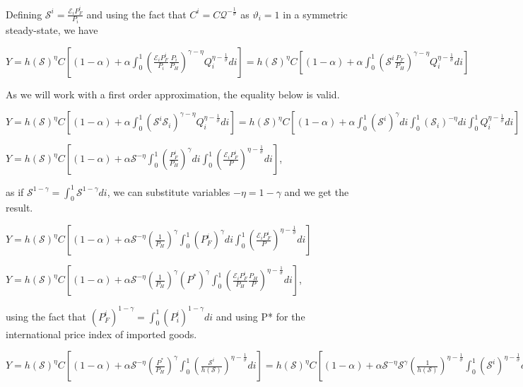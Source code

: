 \documentclass[
]{article}
\begin{document}
Defining
\(\displaystyle \mathcal{S}^i = \frac{\mathcal{E}_i P_F^i}{P_i}\) and
using the fact that
\(\displaystyle C^i=C \mathcal{Q}^{-\frac{1}{\sigma}}\) as
\(\vartheta_i = 1\) in a symmetric steady-state, we have

\(\displaystyle Y = h(\mathcal{S})^{\eta}C \left[ (1-\alpha) + \alpha \int_0^1 \left( \frac{ \mathcal{E}_i P_F^i }{P_i} \frac{P_i}{P_H} \right)^{\gamma-\eta} Q_i^{\eta-\frac{1}{\sigma}} di \right]= h(\mathcal{S})^{\eta}C \left[ (1-\alpha) + \alpha \int_0^1 \left( \mathcal{S}^i \frac{P_F}{P_H} \right)^{\gamma-\eta} Q_i^{\eta-\frac{1}{\sigma}} di \right]\)

As we will work with a first order approximation, the equality below is
valid.

\(\displaystyle Y = h(\mathcal{S})^{\eta}C \left[ (1-\alpha) + \alpha \int_0^1 \left( \mathcal{S}^i \mathcal{S}_i \right)^{\gamma-\eta} Q_i^{\eta-\frac{1}{\sigma}} di \right] = h(\mathcal{S})^{\eta}C \left[ (1-\alpha) + \alpha \int_0^1 ( \mathcal{S}^i)^{\gamma} di \int_0^1 ( \mathcal{S}_i)^{-\eta} di \int_0^1 Q_i^{\eta-\frac{1}{\sigma}} di \right]\)

\(\displaystyle Y = h(\mathcal{S})^{\eta}C \left[ (1-\alpha) + \alpha \mathcal{S}^{-\eta} \int_0^1 \left( \frac{P_F^i}{P_H} \right)^{\gamma} di \int_0^1 \left( \frac{\mathcal{E}_i P_F^i}{P} \right)^{\eta-\frac{1}{\sigma}} di \right]\),

as if
\(\displaystyle \mathcal{S}^{1-\gamma}=\int_0^1 \mathcal{S^{1-\gamma}}di\),
we can substitute variables \(-\eta=1-\gamma\) and we get the result.

\(\displaystyle Y = h(\mathcal{S})^{\eta}C \left[ (1-\alpha) + \alpha \mathcal{S}^{-\eta} \left( \frac{1}{P_H} \right)^{\gamma} \int_0^1 \left( P_F^i \right)^{\gamma} di \int_0^1 \left( \frac{\mathcal{E}_i P_F^i}{P} \right)^{\eta-\frac{1}{\sigma}} di \right]\)

\(Y= h(\mathcal{S})^{\eta}C \left[ (1-\alpha) + \alpha \mathcal{S}^{-\eta} \left( \frac{1}{P_H} \right)^{\gamma} (P^*)^{\gamma} \int_0^1 \left( \frac{\mathcal{E}_i P_F^i}{P_H} \frac{P_H}{P} \right)^{\eta-\frac{1}{\sigma}} di \right]\),

using the fact that
\(\left( P_F^i \right)^{1-\gamma} = \displaystyle \int_0^1 \left( P_i^i \right)^{1-\gamma}di\)
and using P* for the international price index of imported goods.

\(\displaystyle Y = h(\mathcal{S})^{\eta}C \left[ (1-\alpha) + \alpha \mathcal{S}^{-\eta} \left( \frac{P^*}{P_H} \right)^{\gamma} \int_0^1 \left( \frac{\mathcal{S}^i}{h(\mathcal{S})} \right)^{\eta-\frac{1}{\sigma}} di \right] =h(\mathcal{S})^{\eta}C \left[ (1-\alpha) + \alpha \mathcal{S}^{-\eta} \mathcal{S}^\gamma \left( \frac{1}{h(\mathcal{S})} \right)^{\eta-\frac{1}{\sigma}} \int_0^1 ( \mathcal{S}^i )^{\eta-\frac{1}{\sigma}} di \right]\)
\end{document}
